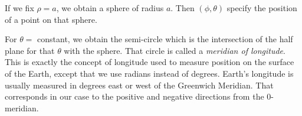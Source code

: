 \begin{example}
\begin{center}
	\end{center}
\end{example}

If we fix $\rho = a$, we obtain a sphere of radius $a$.
Then $(\phi, \theta)$ specify the position of a point on
that sphere.  

For $\theta = $ constant, we obtain the semi-circle
which is the intersection of the half plane for that $\theta$
with the sphere.  That circle is called a {\it meridian of
longitude}.  This is exactly the concept of longitude used to
measure position on the surface of the Earth, except that we
use radians instead of degrees.  Earth's longitude is usually
measured in degrees east or west of the Greenwich Meridian.
That corresponds in our case to the positive and negative
directions from the 0-meridian.  

